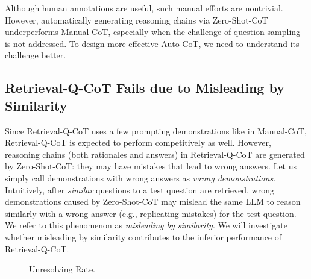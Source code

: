 Although human annotations are useful, such manual efforts are nontrivial.
However, automatically generating reasoning chains via Zero-Shot-CoT underperforms Manual-CoT, especially when the challenge of question sampling is not addressed.
To design more effective Auto-CoT, we need to understand its challenge better.

\subsection{Retrieval-Q-CoT Fails due to Misleading by Similarity} 
\label{subsec:Retrieval-Q-CoT Fails}

Since Retrieval-Q-CoT uses a few prompting demonstrations like in Manual-CoT, Retrieval-Q-CoT is expected to perform competitively as well. However, reasoning chains (both rationales and answers) in Retrieval-Q-CoT are generated by Zero-Shot-CoT: they may have mistakes that lead to wrong answers.
Let us simply call demonstrations with wrong answers as \textit{wrong demonstrations}.
Intuitively, after \emph{similar} questions to a test question are retrieved, wrong demonstrations caused by Zero-Shot-CoT may mislead the same LLM to reason similarly with a wrong answer (e.g., replicating mistakes) for the test question.
We refer to this phenomenon as \textit{misleading by similarity}.
We will investigate whether misleading by similarity contributes to the inferior performance of Retrieval-Q-CoT. 

\begin{wrapfigure}{r}{0.4\textwidth}
    \centering
    \pgfplotsset{width=6.5cm, height=4.5cm}
    \centering
\vspace{-5mm}
    \caption{{Unresolving Rate}.\label{fig:pre-unsolved}
    }
    \vspace{-3mm}
\end{wrapfigure}


